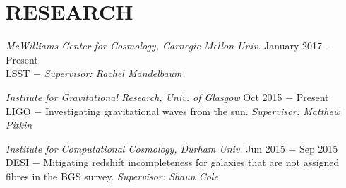 \section{RESEARCH}

{\sl McWilliams Center for Cosmology, Carnegie Mellon Univ.} \hfill January 2017 $-$ Present \\

\hspace{3 mm} LSST $-$
\emph{Supervisor: Rachel Mandelbaum}


{\sl Institute for Gravitational Research, Univ. of Glasgow} \hfill Oct 2015 $-$ Present \\

\hspace{3 mm} LIGO $-$ Investigating gravitational waves from the sun.
\emph{Supervisor: Matthew Pitkin}


{\sl Institute for Computational Cosmology, Durham Univ.} \hfill Jun 2015 $-$ Sep 2015 \\

\hspace{3 mm} DESI $-$ Mitigating redshift incompleteness for galaxies that are not assigned fibres in the BGS survey. \emph{Supervisor: Shaun Cole}
 
